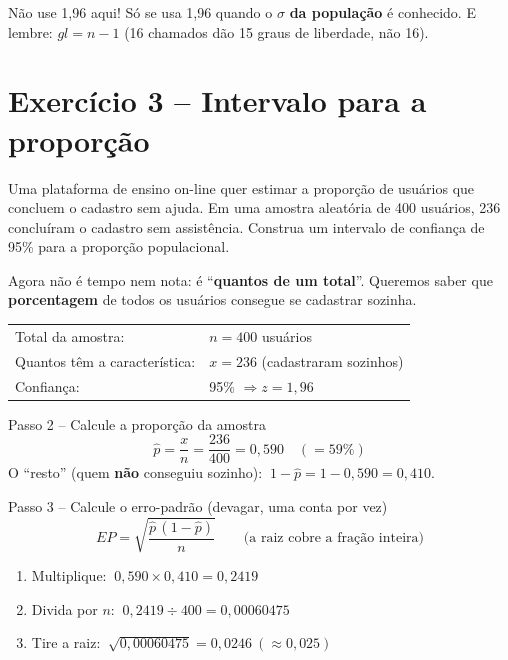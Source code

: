 \documentclass[12pt,a4paper]{article}
\begin{document}
\begin{cuidado}
Não use 1,96 aqui! Só se usa 1,96 quando o $\sigma$ \textbf{da população} é conhecido. E lembre: $gl = n - 1$ (16 chamados dão 15 graus de liberdade, não 16).
\end{cuidado}

\newpage
\section*{Exercício 3 -- Intervalo para a proporção}

\begin{enunciado}
Uma plataforma de ensino on-line quer estimar a proporção de usuários que concluem o cadastro sem ajuda. Em uma amostra aleatória de 400 usuários, 236 concluíram o cadastro sem assistência. Construa um intervalo de confiança de 95\% para a proporção populacional.
\end{enunciado}

\begin{traducao}
Agora não é tempo nem nota: é ``\textbf{quantos de um total}''. Queremos saber que \textbf{porcentagem} de todos os usuários consegue se cadastrar sozinha.
\end{traducao}

\begin{dados}
\begin{tabular}{ll}
Total da amostra: & $n = 400$ usuários \\
Quantos têm a característica: & $x = 236$ (cadastraram sozinhos) \\
Confiança: & 95\% $\Rightarrow z = 1,96$
\end{tabular}
\end{dados}

\begin{passo}{Passo 2 -- Calcule a proporção da amostra}
\[ \hat{p} = \frac{x}{n} = \frac{236}{400} = 0,590 \quad (= 59\%) \]
O ``resto'' (quem \textbf{não} conseguiu sozinho): $\ 1 - \hat{p} = 1 - 0,590 = 0,410$.
\end{passo}

\begin{passo}{Passo 3 -- Calcule o erro-padrão (devagar, uma conta por vez)}
\[ EP = \sqrt{\frac{\hat{p}\,(1-\hat{p})}{n}} \qquad\text{(a raiz cobre a fração inteira)} \]
\begin{enumerate}[leftmargin=*,itemsep=2pt]
  \item Multiplique: $\ 0,590 \times 0,410 = 0,2419$
  \item Divida por $n$: $\ 0,2419 \div 400 = 0,00060475$
  \item Tire a raiz: $\ \sqrt{0,00060475} = 0,0246 \ (\approx 0,025)$
\end{enumerate}
\end{passo}
\end{document}
